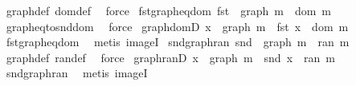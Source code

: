 \begin{isabellebody}
\ graph{\isacharunderscore}{\kern0pt}def\ dom{\isacharunderscore}{\kern0pt}def\ \isamarkupfalse%
\ force%
\endisatagproof
{\isafoldproof}%
%
\isadelimproof
\isanewline
%
\endisadelimproof
\isanewline
{}\isamarkupfalse%
\ fst{\isacharunderscore}{\kern0pt}graph{\isacharunderscore}{\kern0pt}eq{\isacharunderscore}{\kern0pt}dom{\isacharcolon}{\kern0pt}\ {\isachardoublequoteopen}fst\ {\isacharbackquote}{\kern0pt}\ graph\ m\ {\isacharequal}{\kern0pt}\ dom\ m{\isachardoublequoteclose}\isanewline
%
\isadelimproof
\ \ %
\endisadelimproof
%
\isatagproof
{}\isamarkupfalse%
\ graph{\isacharunderscore}{\kern0pt}eq{\isacharunderscore}{\kern0pt}to{\isacharunderscore}{\kern0pt}snd{\isacharunderscore}{\kern0pt}dom\ \isamarkupfalse%
\ force%
\endisatagproof
{\isafoldproof}%
%
\isadelimproof
\isanewline
%
\endisadelimproof
\isanewline
{}\isamarkupfalse%
\ graph{\isacharunderscore}{\kern0pt}domD{\isacharcolon}{\kern0pt}\ {\isachardoublequoteopen}x\ {\isasymin}\ graph\ m\ {\isasymLongrightarrow}\ fst\ x\ {\isasymin}\ dom\ m{\isachardoublequoteclose}\isanewline
%
\isadelimproof
\ \ %
\endisadelimproof
%
\isatagproof
{}\isamarkupfalse%
\ fst{\isacharunderscore}{\kern0pt}graph{\isacharunderscore}{\kern0pt}eq{\isacharunderscore}{\kern0pt}dom\ \isamarkupfalse%
\ {\isacharparenleft}{\kern0pt}metis\ imageI{\isacharparenright}{\kern0pt}%
\endisatagproof
{\isafoldproof}%
%
\isadelimproof
\isanewline
%
\endisadelimproof
\isanewline
{}\isamarkupfalse%
\ snd{\isacharunderscore}{\kern0pt}graph{\isacharunderscore}{\kern0pt}ran{\isacharcolon}{\kern0pt}\ {\isachardoublequoteopen}snd\ {\isacharbackquote}{\kern0pt}\ graph\ m\ {\isacharequal}{\kern0pt}\ ran\ m{\isachardoublequoteclose}\isanewline
%
\isadelimproof
\ \ %
\endisadelimproof
%
\isatagproof
{}\isamarkupfalse%
\ graph{\isacharunderscore}{\kern0pt}def\ ran{\isacharunderscore}{\kern0pt}def\ \isamarkupfalse%
\ force%
\endisatagproof
{\isafoldproof}%
%
\isadelimproof
\isanewline
%
\endisadelimproof
\isanewline
{}\isamarkupfalse%
\ graph{\isacharunderscore}{\kern0pt}ranD{\isacharcolon}{\kern0pt}\ {\isachardoublequoteopen}x\ {\isasymin}\ graph\ m\ {\isasymLongrightarrow}\ snd\ x\ {\isasymin}\ ran\ m{\isachardoublequoteclose}\isanewline
%
\isadelimproof
\ \ %
\endisadelimproof
%
\isatagproof
{}\isamarkupfalse%
\ snd{\isacharunderscore}{\kern0pt}graph{\isacharunderscore}{\kern0pt}ran\ \isamarkupfalse%
\ {\isacharparenleft}{\kern0pt}metis\ imageI{\isacharparenright}{\kern0pt}%

\end{isabellebody}
